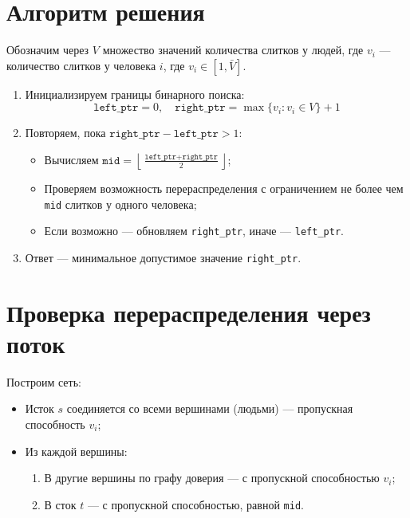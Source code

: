 \documentclass{article}
\begin{document}
\section{Алгоритм решения}

Обозначим через $V$ множество значений количества слитков у людей, где $v_i$ — количество слитков у человека $i$, где $v_i \in [1, \bar{V}]$.

\begin{enumerate}
    \item Инициализируем границы бинарного поиска:
    \[
    \texttt{left\_ptr} = 0,\quad \texttt{right\_ptr} = \max\{v_i : v_i \in V\} + 1
    \]
    
    \item Повторяем, пока $\texttt{right\_ptr} - \texttt{left\_ptr} > 1$:
    \begin{itemize}
        \item Вычисляем $\texttt{mid} = \left\lfloor \frac{\texttt{left\_ptr} + \texttt{right\_ptr}}{2} \right\rfloor$;
        \item Проверяем возможность перераспределения с ограничением не более чем \texttt{mid} слитков у одного человека;
        \item Если возможно — обновляем \texttt{right\_ptr}, иначе — \texttt{left\_ptr}.
    \end{itemize}
    
    \item Ответ — минимальное допустимое значение \texttt{right\_ptr}.
\end{enumerate}

\section{Проверка перераспределения через поток}

Построим сеть:
\begin{itemize}
    \item Исток $s$ соединяется со всеми вершинами (людьми) — пропускная способность $v_i$;
    \item Из каждой вершины:
    \begin{enumerate}
        \item В другие вершины по графу доверия — с пропускной способностью $v_i$;
        \item В сток $t$ — с пропускной способностью, равной \texttt{mid}.
    \end{enumerate}
\end{itemize}
\end{document}
